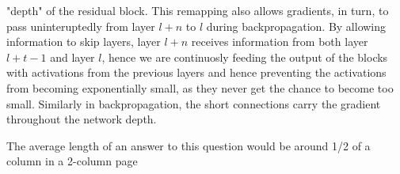 {{"depth" of the residual block. This remapping also allows gradients, in turn, to pass uninteruptedly from layer $l+n$ to $l$ during backpropagation. By allowing information to skip layers, layer $l+n$ receives information from both layer $l+t−1$ and layer $l$, hence we are continuosly feeding the output of the blocks with activations from the previous layers and hence preventing the activations from becoming exponentially small, as they never get the chance to become too small. Similarly in backpropagation, the short connections carry the gradient throughout the network depth. 


The average length of an answer to this question would be around 1/2 of a column in a 2-column page}
}

\newcommand{\questionFour} {
\youranswer{Question 4 - Present and discuss the experiment results (all of the results and not just the ones you had to fill in) in Table 1 and Figures 4 and 5 (you may use any of the other Figures if you think they are relevant to your analysis). You will have to determine what data are relevant to the discussion, and what information can be extracted from it. Also, discuss what further experiments you would have ran on any combination of VGG08, VGG38, BN, RC in order to
\begin{itemize}
    \item Improve performance of the model trained (explain why you expect your suggested experiments will help with this).
    \item Learn more about the behaviour of BN and RC (explain what you are trying to learn and how).
\end{itemize}

The average length for an answer to this question is approximately 1 of the columns in a 2-column page}
}

